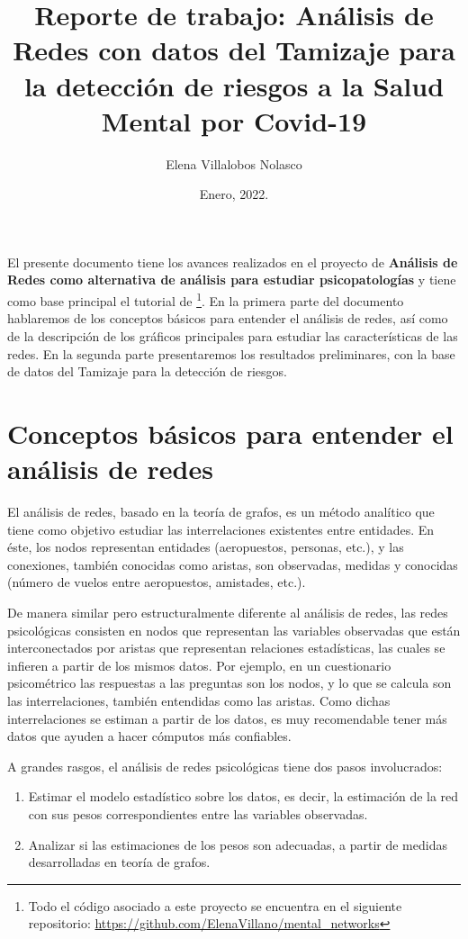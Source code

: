 \documentclass[11pt,spanish]{article}\usepackage[]{graphicx}\usepackage[]{color}
\title{\huge{Reporte de trabajo: Análisis de Redes con datos del Tamizaje para la detección de riesgos a la Salud Mental por Covid-19}}
\author[ ]{Elena Villalobos Nolasco}
\date{Enero, 2022.}
\begin{document}
\maketitle


El presente documento tiene los avances realizados en el proyecto de {\bf Análisis de Redes como alternativa de análisis para estudiar psicopatologías} y tiene como base principal el tutorial de \cite{main_tutorial}\footnote{Todo el código asociado a este proyecto se encuentra en el siguiente repositorio: \url{https://github.com/ElenaVillano/mental_networks}}. En la primera parte del documento hablaremos de los conceptos básicos para entender el análisis de redes, así como de la descripción de los gráficos principales para estudiar las características de las redes. En la segunda parte presentaremos los resultados preliminares, con la base de datos del Tamizaje para la detección de riesgos. 


\section{Conceptos básicos para entender el análisis de redes}

El análisis de redes, basado en la teoría de grafos, es un método analítico que tiene como objetivo estudiar las interrelaciones existentes entre entidades. En éste, los nodos representan entidades (aeropuestos, personas, etc.), y las conexiones, también conocidas como aristas, son observadas, medidas y conocidas (número de vuelos entre aeropuestos, amistades, etc.). 

De manera similar pero estructuralmente diferente al análisis de redes, las redes psicológicas consisten en nodos que representan las variables observadas que están interconectados por aristas que representan relaciones estadísticas, las cuales se infieren a partir de los mismos datos. Por ejemplo, en un cuestionario psicométrico las respuestas a las preguntas son los nodos, y lo que se calcula son las interrelaciones, también entendidas como las aristas. Como dichas interrelaciones se estiman a partir de los datos, es muy recomendable tener más datos que ayuden a hacer cómputos más confiables.

A grandes rasgos, el análisis de redes psicológicas tiene dos pasos involucrados:

\begin{enumerate}
  \item Estimar el modelo estadístico sobre los datos, es decir, la estimación de la red con sus pesos correspondientes entre las variables observadas. 
  \item Analizar si las estimaciones de los pesos son adecuadas, a partir de medidas desarrolladas en teoría de grafos. 
\end{enumerate}
\end{document}
